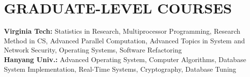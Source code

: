 \section{GRADUATE-LEVEL COURSES}
\vspace{0.03in}
{\bf Virginia Tech:} Statistics in Research, Multiprocessor Programming,
Research Method in CS, Advanced Parallel Computation, Advanced Topics in System
and Network Security, Operating Systems, Software Refactoring\vspace{0.02in}\\
{\bf Hanyang Univ.:} Advanced Operating System, Computer Algorithms,
Database System Implementation, Real-Time Systems,
Cryptography, Database Tuning
